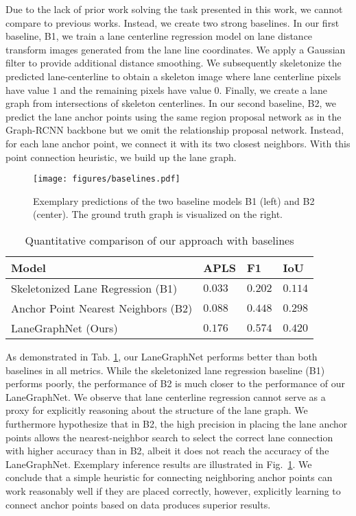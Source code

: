 \documentclass[letterpaper, 10 pt, conference]{ieeeconf}
\begin{document}
Due to the lack of prior work solving the task presented in this work, we cannot compare to previous works. Instead, we create two strong baselines. In our first baseline, B1, we train a lane centerline regression model on lane distance transform images generated from the lane line coordinates. We apply a Gaussian filter to provide additional distance smoothing. We subsequently skeletonize the predicted lane-centerline to obtain a skeleton image where lane centerline pixels have value $1$ and the remaining pixels have value $0$. Finally, we create a lane graph from intersections of skeleton centerlines. In our second baseline, B2, we predict the lane anchor points using the same region proposal network as in the Graph-RCNN backbone but we omit the relationship proposal network. Instead, for each lane anchor point, we connect it with its two closest neighbors. With this point connection heuristic, we build up the lane graph.



\begin{figure}
\centering
\texttt{[image: figures/baselines.pdf]}
    \caption{Exemplary predictions of the two baseline models B1 (left) and B2 (center). The ground truth graph is visualized on the right.}
    \label{fig:qualitative-baselines} 
\end{figure}




\begin{table}
\centering
\caption{Quantitative comparison of our approach with baselines}
\label{tab:baselines}
\begin{tabular}{p{4.5cm}p{0.6cm}p{0.6cm}p{0.6cm}}
Model & APLS & F1 & IoU  \\
 \hline
Skeletonized Lane Regression (B1) & $0.033$ & $0.202$ & $0.114$ \\
Anchor Point Nearest Neighbors (B2) & $0.088$ & $0.448$ & $0.298$ \\
 \hline
LaneGraphNet (Ours) & $\mathbf{0.176}$ & $\mathbf{0.574}$ & $\mathbf{0.420}$ \\
\end{tabular}
\end{table}

As demonstrated in Tab. \ref{tab:baselines}, our LaneGraphNet performs better than both baselines in all metrics. While the skeletonized lane regression baseline (B1) performs poorly, the performance of B2 is much closer to the performance of our LaneGraphNet. We observe that lane centerline regression cannot serve as a proxy for explicitly reasoning about the structure of the lane graph. We furthermore hypothesize that in B2, the high precision in placing the lane anchor points allows the nearest-neighbor search to select the correct lane connection with higher accuracy than in B2, albeit it does not reach the accuracy of the LaneGraphNet. Exemplary inference results are illustrated in Fig.~\ref{fig:qualitative-baselines}.  We conclude that a simple heuristic for connecting neighboring anchor points can work reasonably well if they are placed correctly, however, explicitly learning to connect anchor points based on data produces superior results.
\end{document}
